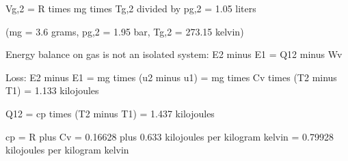 Vg,2 = R times mg times Tg,2 divided by pg,2  
= 1.05 liters  

(mg = 3.6 grams, pg,2 = 1.95 bar, Tg,2 = 273.15 kelvin)  

Energy balance on gas is not an isolated system:  
E2 minus E1 = Q12 minus Wv  

Loss:  
E2 minus E1 = mg times (u2 minus u1) = mg times Cv times (T2 minus T1)  
= 1.133 kilojoules  

Q12 = cp times (T2 minus T1) = 1.437 kilojoules  

cp = R plus Cv = 0.16628 plus 0.633 kilojoules per kilogram kelvin = 0.79928 kilojoules per kilogram kelvin